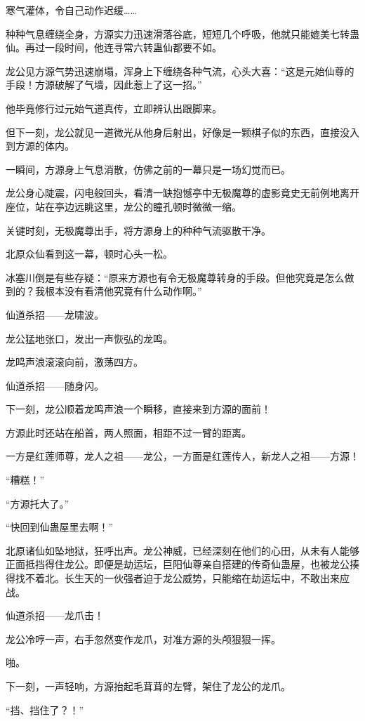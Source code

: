 \begin{this_body}
寒气灌体，令自己动作迟缓……

种种气息缠绕全身，方源实力迅速滑落谷底，短短几个呼吸，他就只能媲美七转蛊仙。再过一段时间，他连寻常六转蛊仙都要不如。

龙公见方源气势迅速崩塌，浑身上下缠绕各种气流，心头大喜：“这是元始仙尊的手段！方源破解了气墙，因此惹上了这一招。”

他毕竟修行过元始气道真传，立即辨认出跟脚来。

但下一刻，龙公就见一道微光从他身后射出，好像是一颗棋子似的东西，直接没入到方源的体内。

一瞬间，方源身上气息消散，仿佛之前的一幕只是一场幻觉而已。

龙公身心陡震，闪电般回头，看清一缺抱憾亭中无极魔尊的虚影竟史无前例地离开座位，站在亭边远眺这里，龙公的瞳孔顿时微微一缩。

关键时刻，无极魔尊出手，将方源身上的种种气流驱散干净。

北原众仙看到这一幕，顿时心头一松。

冰塞川倒是有些存疑：“原来方源也有令无极魔尊转身的手段。但他究竟是怎么做到的？我根本没有看清他究竟有什么动作啊。”

仙道杀招——龙啸波。

龙公猛地张口，发出一声恢弘的龙鸣。

龙鸣声浪滚滚向前，激荡四方。

仙道杀招——随身闪。

下一刻，龙公顺着龙鸣声浪一个瞬移，直接来到方源的面前！

方源此时还站在船首，两人照面，相距不过一臂的距离。

一方是红莲师尊，龙人之祖——龙公，一方面是红莲传人，新龙人之祖——方源！

“糟糕！”

“方源托大了。”

“快回到仙蛊屋里去啊！”

北原诸仙如坠地狱，狂呼出声。龙公神威，已经深刻在他们的心田，从未有人能够正面抵挡得住龙公。即便是劫运坛，巨阳仙尊亲自搭建的传奇仙蛊屋，也被龙公揍得找不着北。长生天的一伙强者迫于龙公威势，只能缩在劫运坛中，不敢出来应战。

仙道杀招——龙爪击！

龙公冷哼一声，右手忽然变作龙爪，对准方源的头颅狠狠一挥。

啪。

下一刻，一声轻响，方源抬起毛茸茸的左臂，架住了龙公的龙爪。

“挡、挡住了？！”


\end{this_body}
